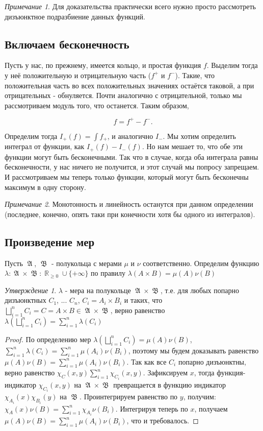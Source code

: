 \documentclass[a4paper]{article}
\theoremstyle{indented}
\theoremstyle{definition}
\theoremstyle{remark}
\newtheorem{remark}{Примечание}
\newtheorem{stat}{Утверждение}
\DeclareMathOperator{\RR}{\mathbb{R}}
\DeclareMathOperator{\GA}{\mathfrak{A}}
\DeclareMathOperator{\GB}{\mathfrak{B}}
\begin{document}
\begin{remark}
    Для доказательства практически всего нужно просто рассмотреть дизъюнктное подразбиение данных функций.
\end{remark}

\subsection{Включаем бесконечность}

Пусть у нас, по прежнему, имеется кольцо, и простая функция $f$. Выделим тогда у неё положительную и отрицательную часть ($f^{+}$ и $f^{-}$). Такие, что положительная часть во всех положительных значениях остаётся таковой, а при отрицательных - обнуляется. Почти аналогично с отрицательной, только мы рассмотриваем модуль того, что останется. Таким образом,

\[
    f = f^{+} - f^{-}. 
\]

Определим тогда $I_{+}(f) = \int f_{+}$, и аналогично $I_{-}$. Мы хотим определить интеграл от функции, как $I_{+}(f) - I_{-}(f)$. Но нам мешает то, что обе эти функции могут быть бесконечными. Так что в случае, когда оба интеграла равны бесконечности, у нас ничего не получится, и этот случай мы попросу запрещаем. И рассмотриваем мы теперь только функции, который могут быть бесконечны максимум в одну сторону.

\begin{remark}
    Монотонность и линейность останутся при данном определении (последнее, конечно, опять таки при конечности хотя бы одного из интегралов). 
\end{remark}

\subsection{Произведение мер}
Пусть $\GA$, $\GB$ - полукольца с мерами $\mu$ и $\nu$ соответственно. Определим функцию $\lambda: \GA \times \GB: \RR_{\geq 0} \cup \{+\infty\}$ по правилу $\lambda(A \times B)=\mu(A)\nu(B)$
\begin{stat}
$\lambda$ - мера на полукольце $\GA \times \GB$, т.е. для любых попарно дизъюнктных $C_1$, ... $C_n$, $C_i=A_i \times B_i$ и таких, что $\bigsqcup_{i=1}^n C_i =C = A \times B \in \GA \times \GB$, верно равенство $\lambda(\bigsqcup_{i=1}^n C_i)=\sum_{i=1}^n \lambda(C_i)$
\end{stat}
\begin{proof}
По определению мер $\lambda(\bigsqcup_{i=1}^n C_i)=\mu(A)\nu(B)$, $\sum_{i=1}^n \lambda(C_i)=\sum_{i=1}^n \mu(A_i)\nu(B_i)$, поэтому мы будем доказывать равенство $\mu(A)\nu(B)=\sum_{i=1}^n \mu(A_i)\nu(B_i)$. Так как все $C_i$ попарно дизъюнктны, верно равенство $\chi_{C}(x, y) \sum_{i=1}^n \chi_{C_i}(x, y)$. Зафиксируем $x$, тогда функция-индикатор $\chi_{C_i}(x, y)$ на $\GA \times \GB$ превращается в функцию индикатор $\chi_{A_i}(x)\chi_{B_i}(y)$ на $\GB$. Проинтегрируем равенство по $y$, получим: $\chi_A(x)\nu(B)=\sum_{i=1}^n \chi_{A_i} \nu(B_i)$. Интегрируя теперь по $x$, получаем $\mu(A)\nu(B)=\sum_{i=1}^n \mu(A_i)\nu(B_i)$, что и требовалось.
\end{proof}
\end{document}
